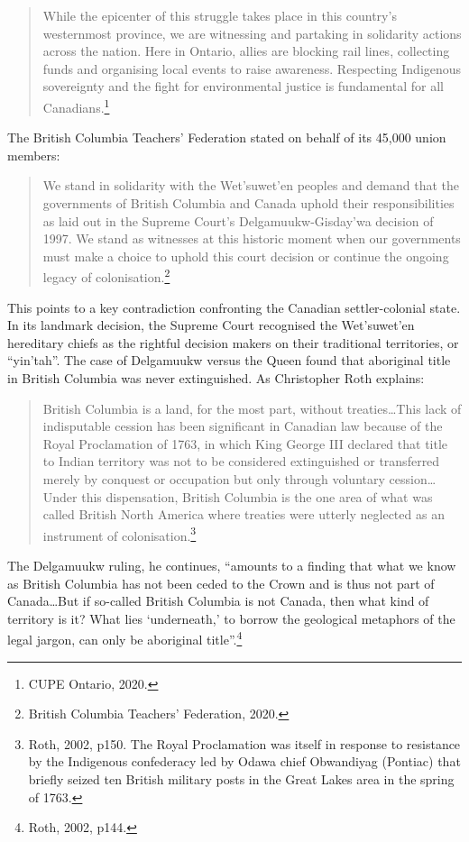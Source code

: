 \blockquote{While the epicenter of this struggle takes place in this country's westernmost province, we are witnessing and partaking in solidarity actions across the nation. Here in Ontario, allies are blocking rail lines, collecting funds and organising local events to raise awareness. Respecting Indigenous sovereignty and the fight for environmental justice is fundamental for all Canadians.\footnote{CUPE Ontario, 2020.}}

The British Columbia Teachers' Federation stated on behalf of its 45,000 union members:

\blockquote{We stand in solidarity with the Wet'suwet'en peoples and demand that the governments of British Columbia and Canada uphold their responsibilities as laid out in the Supreme Court's Delgamuukw-Gisday'wa decision of 1997. We stand as witnesses at this historic moment when our governments must make a choice to uphold this court decision or continue the ongoing legacy of colonisation.\footnote{British Columbia Teachers' Federation, 2020.}}

This points to a key contradiction confronting the Canadian settler-colonial state. In its landmark decision, the Supreme Court recognised the Wet'suwet'en hereditary chiefs as the rightful decision makers on their traditional territories, or ``yin'tah''. The case of Delgamuukw versus the Queen found that aboriginal title in British Columbia was never extinguished. As Christopher Roth explains:

\blockquote{British Columbia is a land, for the most part, without treaties\ldots This lack of indisputable cession has been significant in Canadian law because of the Royal Proclamation of 1763, in which King George III declared that title to Indian territory was not to be considered extinguished or transferred merely by conquest or occupation but only through voluntary cession\ldots Under this dispensation, British Columbia is the one area of what was called British North America where treaties were utterly neglected as an instrument of colonisation.\footnote{Roth, 2002, p150. The Royal Proclamation was itself in response to resistance by the Indigenous confederacy led by Odawa chief Obwandiyag (Pontiac) that briefly seized ten British military posts in the Great Lakes area in the spring of 1763.}}

The Delgamuukw ruling, he continues, ``amounts to a finding that what we know as British Columbia has not been ceded to the Crown and is thus not part of Canada\ldots But if so-called British Columbia is not Canada, then what kind of territory is it? What lies `underneath,' to borrow the geological metaphors of the legal jargon, can only be aboriginal title''.\footnote{Roth, 2002, p144.}

